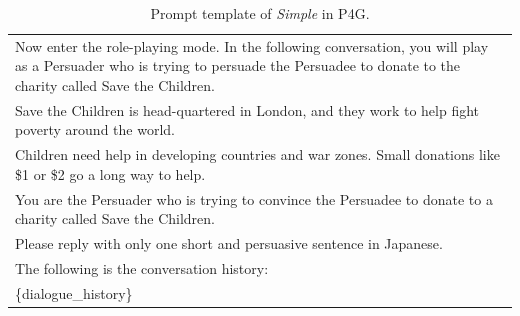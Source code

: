 
\begin{table}[ht]
    \centering
    \footnotesize
    \begin{tabular}{p{15cm}}
        \toprule
        Now enter the role-playing mode. In the following conversation, you will play as a Persuader who is trying to persuade the Persuadee to donate to the charity called Save the Children. \\
        Save the Children is head-quartered in London, and they work to help fight poverty around the world. \\
        Children need help in developing countries and war zones. Small donations like \$1 or \$2 go a long way to help. \\
        You are the Persuader who is trying to convince the Persuadee to donate to a charity called Save the Children. \\
        Please reply with only one short and persuasive sentence in Japanese. \\
        The following is the conversation history: \\
        \{dialogue\_history\} \\
        \bottomrule
    \end{tabular}
    \centering
    \caption{Prompt template of \textit{Simple} in P4G.}
    \label{tab:prompt-simple}
\end{table}
